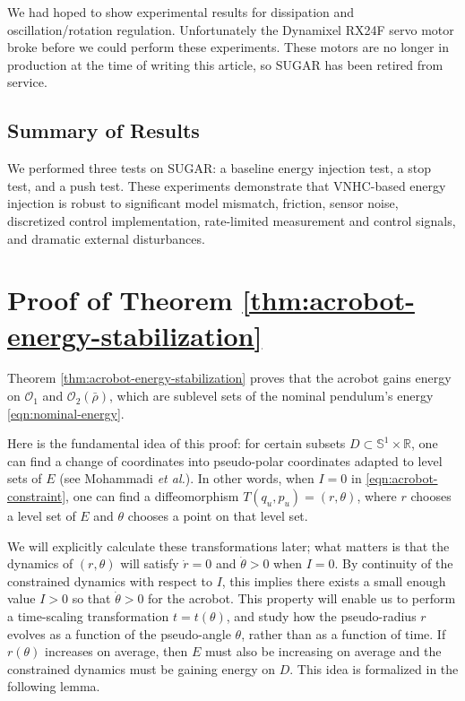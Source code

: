 \documentclass[journal,twoside,web]{ieeecolor}
\newcommand*{\R}{\mathbb{R}}
\newcommand*{\Sone}{\mathbb{S}^1}
\newcommand*{\SxR}{\Sone \times \R}
\newcommand*{\etal}{\MakeLowercase{\textit{et al.}}}
\begin{document}
{We had hoped to show experimental results for dissipation and
oscillation/rotation regulation. 
Unfortunately the Dynamixel RX24F servo motor broke before we could perform
these experiments.
These motors are no longer in production at the time of writing this article, so
SUGAR has been retired from service.

\subsection{Summary of Results} 
We performed three tests on SUGAR: a baseline energy injection test,
a stop test, and a push test.
These experiments demonstrate that VNHC-based energy injection is robust to
significant model mismatch, friction, sensor noise, discretized control
implementation, rate-limited measurement and control signals, and dramatic
external disturbances.

\section{Proof of Theorem \ref{thm:acrobot-energy-stabilization}}\label{sec:proof}
Theorem \ref{thm:acrobot-energy-stabilization} proves that the acrobot gains
energy on \(\mathcal{O}_1\) and \(\mathcal{O}_2(\bar{\rho})\), which are
sublevel sets of the nominal pendulum's energy \eqref{eqn:nominal-energy}.

Here is the fundamental idea of this proof: for certain subsets
\(D \subset \SxR\), one can find a change of coordinates into 
pseudo-polar coordinates adapted to level sets of \(E\) 
(see Mohammadi \etal \cite{dynamic_vhcs_stabilize_closed_orbits}).
In other words, when \(I = 0\) in \eqref{eqn:acrobot-constraint}, one can find
a diffeomorphism \(T(q_u,p_u) = (r,\theta)\), where \(r\)
chooses a level set of \(E\) and \(\theta\) chooses a point on that level set.

We will explicitly calculate these transformations later;
what matters is that the dynamics of \((r,\theta)\) will satisfy 
\(\dot{r} = 0\) and \(\dot{\theta} > 0\) when \(I = 0\).
By continuity of the constrained dynamics with respect to \(I\), this implies 
there exists a small enough value \(I > 0\) so that \(\dot{\theta} > 0\) for the
acrobot.
This property will enable us to perform a time-scaling transformation 
\(t = t(\theta)\), and study how the pseudo-radius \(r\) evolves as a function
of the pseudo-angle \(\theta\), rather than as a function of time.
If \(r(\theta)\) increases on average, then \(E\) must also be increasing
on average and the constrained dynamics must be gaining energy on \(D\).
This idea is formalized in the following lemma.

}
\end{document}
